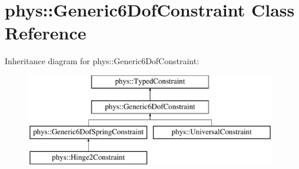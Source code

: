 \hypertarget{classphys_1_1Generic6DofConstraint}{
\section{phys::Generic6DofConstraint Class Reference}
\label{de/d2a/classphys_1_1Generic6DofConstraint}
}
Inheritance diagram for phys::Generic6DofConstraint:\begin{figure}[H]
\begin{center}
\leavevmode
\includegraphics[height=4cm]{de/d2a/classphys_1_1Generic6DofConstraint}
\end{center}
\end{figure}
